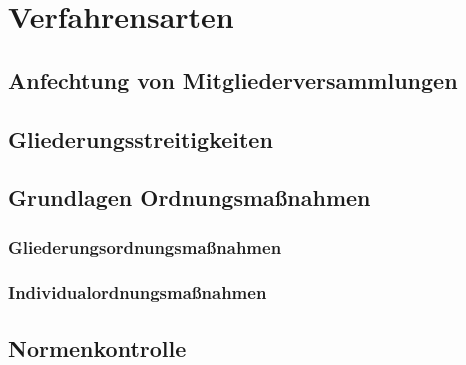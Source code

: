 
\chapter{Verfahrensarten}
\section{Anfechtung von Mitgliederversammlungen}
\blindtext[1]
\section{Gliederungsstreitigkeiten}
\blindtext[1]
\section{Grundlagen Ordnungsmaßnahmen}
\blindtext[1]
\subsection{Gliederungsordnungsmaßnahmen}
\blindtext[5]
\subsection{Individualordnungsmaßnahmen}
\blindtext[5]
\section{Normenkontrolle}
\blindtext[1]

\chapterbib
